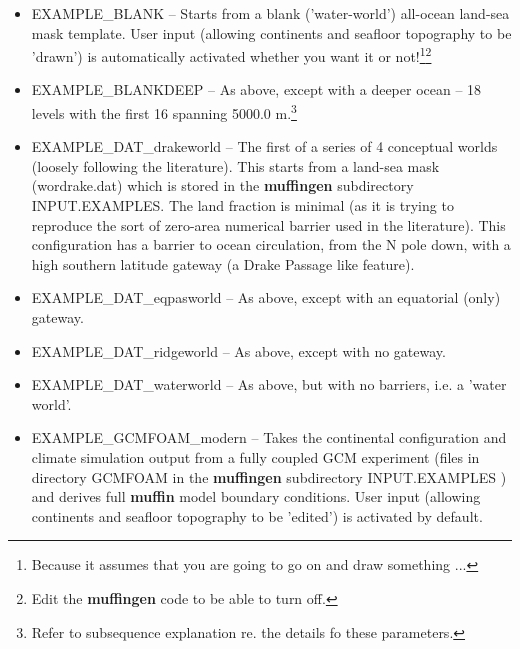 \documentclass[11pt,fleqn]{book} %
\begin{document}
\vspace{1mm}
\begin{itemize}[noitemsep]

\vspace{1mm}
\item \textsf{\footnotesize EXAMPLE\_BLANK} -- Starts from a blank ('water-world') all-ocean land-sea mask template. User input (allowing continents and seafloor topography to be 'drawn') is automatically activated whether you want it or not!\footnote{Because it assumes that you are going to go on and draw something ...}\footnote{Edit the \textbf{muffingen} code to be able to turn off.}

\vspace{1mm}
\item \textsf{\footnotesize EXAMPLE\_BLANKDEEP} -- As above, except with a deeper ocean -- 18 levels with the first 16 spanning 5000.0 m.\footnote{Refer to subsequence explanation re. the details fo these parameters.}

\vspace{1mm}
\item \textsf{\footnotesize EXAMPLE\_DAT\_drakeworld} -- The first of a series of 4 conceptual worlds (loosely following the literature). This starts from a land-sea mask (\footnotesize\textsf{wordrake.dat}\normalsize) which is stored in the \textbf{muffingen} subdirectory \footnotesize\textsf{INPUT.EXAMPLES}\normalsize. The land fraction is minimal (as it is trying to reproduce the sort of zero-area numerical barrier used in the literature). This configuration has a barrier to ocean circulation, from the N pole down, with a high southern latitude gateway (a Drake Passage like feature). 

\vspace{1mm}
\item \textsf{\footnotesize EXAMPLE\_DAT\_eqpasworld} -- As above, except with an equatorial (only) gateway.

\vspace{1mm}
\item \textsf{\footnotesize EXAMPLE\_DAT\_ridgeworld} -- As above, except with no gateway.

\vspace{1mm}
\item \textsf{\footnotesize EXAMPLE\_DAT\_waterworld} -- As above, but with no barriers, i.e. a 'water world'.

\vspace{1mm}
\item \textsf{\footnotesize EXAMPLE\_GCMFOAM\_modern} -- Takes the continental configuration and climate simulation output from a fully coupled GCM experiment (files in directory \footnotesize\textsf{GCMFOAM }\normalsize in the \textbf{muffingen} subdirectory \footnotesize\textsf{INPUT.EXAMPLES }\normalsize) and derives full \textbf{muffin} model boundary conditions. User input (allowing continents and seafloor topography to be 'edited') is activated by default.


\end{itemize}
\end{document}
